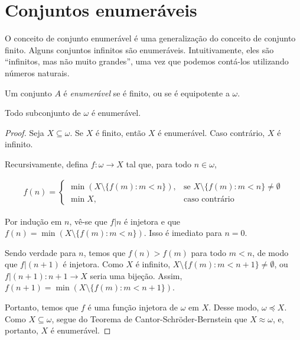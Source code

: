 \section{Conjuntos enumeráveis}\label{sec:conjuntosEnumeraveis}

O conceito de conjunto enumerável é uma generalização do conceito de conjunto finito.
Alguns conjuntos infinitos são enumeráveis.
Intuitivamente, eles são ``infinitos, mas não muito grandes'', uma vez que podemos contá-los utilizando números naturais.

\begin{definition}[$Z^--P$]\label{def:enumerabilidade}
    Um conjunto $A$ é \emph{enumerável} se é finito, ou se é equipotente a $\omega$.
\end{definition}

\begin{lemma}[$Z^-$]\label{lem:subconjuntoDeOmegaEhEnumeravel}
    Todo subconjunto de $\omega$ é enumerável.
\end{lemma}
\begin{proof}
    Seja $X\subseteq \omega$.
    Se $X$ é finito, então $X$ é enumerável.
    Caso contrário, $X$ é infinito.

    Recursivamente, defina $f:\omega\to X$ tal que, para todo $n \in \omega$,

    \begin{align*}
        f(n) = \begin{cases}
            \min(X\setminus \{f(m) : m<n\}), & \text{se } X\setminus \{f(m) : m<n\}\neq \emptyset\\
            \min X, & \text{caso contrário}
        \end{cases}
    \end{align*}

    Por indução em $n$, vê-se que $f|n$ é injetora e que $f(n)=\min(X\setminus \{f(m) : m<n\})$.
    Isso é imediato para $n=0$.
    
    Sendo verdade para $n$, temos que $f(n)>f(m)$ para todo $m<n$, de modo que $f|(n+1)$ é injetora.
    Como $X$ é infinito, $X\setminus \{f(m) : m<n+1\}\neq \emptyset$, ou $f|(n+1): n+1\to X$ seria uma bijeção.
    Assim, $f(n+1)=\min(X\setminus \{f(m) : m<n+1\})$.

    Portanto, temos que $f$ é uma função injetora de $\omega$ em $X$.
    Desse modo, $\omega\preceq X$.
    Como $X\subseteq \omega$, segue do Teorema de Cantor-Schröder-Bernstein que $X\approx \omega$, e, portanto, $X$ é enumerável.
\end{proof}

